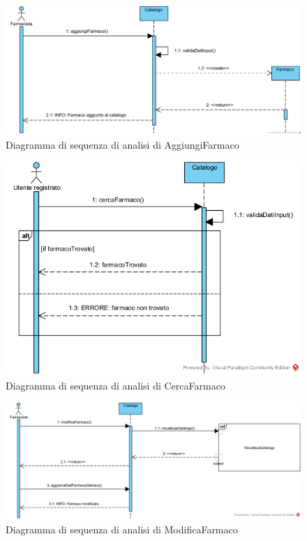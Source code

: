 \begin{figure}[!hbp]
	\centering
	\includegraphics[width=0.8\linewidth]{assets/sequence_analisi/SequenceAnalisiAggiungiFarmaco.png}
	\caption{Diagramma di sequenza di analisi di AggiungiFarmaco}
\end{figure}

\begin{figure}[!hbp]
	\centering
	\includegraphics[width=0.7\linewidth]{assets/sequence_analisi/SequenceAnalisiCercaFarmaco.png}
	\caption{Diagramma di sequenza di analisi di CercaFarmaco}
\end{figure}

\begin{figure}[!hbp]
	\centering
	\includegraphics[width=\linewidth]{assets/sequence_analisi/SequenceAnalisiModificaFarmaco.png}
	\caption{Diagramma di sequenza di analisi di ModificaFarmaco}
\end{figure}


